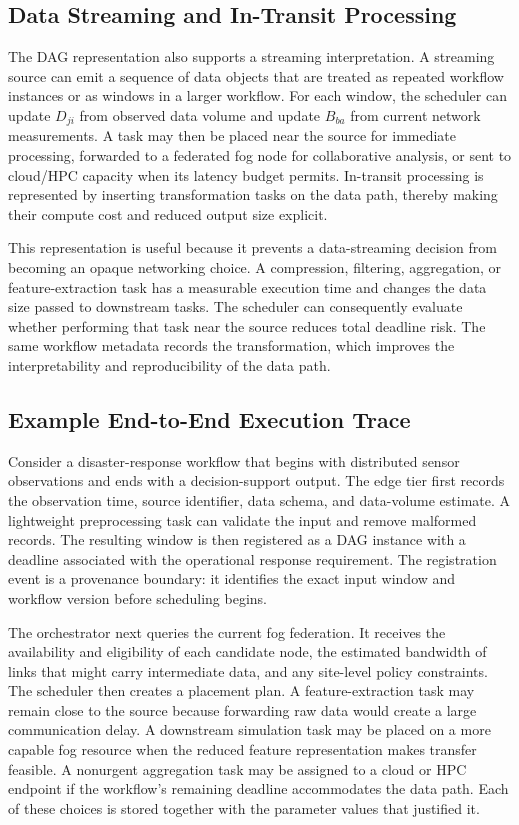 \subsection{Data Streaming and In-Transit Processing}

The DAG representation also supports a streaming interpretation. A streaming source can emit a sequence of data objects that are treated as repeated workflow instances or as windows in a larger workflow. For each window, the scheduler can update $D_{ji}$ from observed data volume and update $B_{ba}$ from current network measurements. A task may then be placed near the source for immediate processing, forwarded to a federated fog node for collaborative analysis, or sent to cloud/HPC capacity when its latency budget permits. In-transit processing is represented by inserting transformation tasks on the data path, thereby making their compute cost and reduced output size explicit.

This representation is useful because it prevents a data-streaming decision from becoming an opaque networking choice. A compression, filtering, aggregation, or feature-extraction task has a measurable execution time and changes the data size passed to downstream tasks. The scheduler can consequently evaluate whether performing that task near the source reduces total deadline risk. The same workflow metadata records the transformation, which improves the interpretability and reproducibility of the data path.

\subsection{Example End-to-End Execution Trace}

Consider a disaster-response workflow that begins with distributed sensor observations and ends with a decision-support output. The edge tier first records the observation time, source identifier, data schema, and data-volume estimate. A lightweight preprocessing task can validate the input and remove malformed records. The resulting window is then registered as a DAG instance with a deadline associated with the operational response requirement. The registration event is a provenance boundary: it identifies the exact input window and workflow version before scheduling begins.

The orchestrator next queries the current fog federation. It receives the availability and eligibility of each candidate node, the estimated bandwidth of links that might carry intermediate data, and any site-level policy constraints. The scheduler then creates a placement plan. A feature-extraction task may remain close to the source because forwarding raw data would create a large communication delay. A downstream simulation task may be placed on a more capable fog resource when the reduced feature representation makes transfer feasible. A nonurgent aggregation task may be assigned to a cloud or HPC endpoint if the workflow's remaining deadline accommodates the data path. Each of these choices is stored together with the parameter values that justified it.

